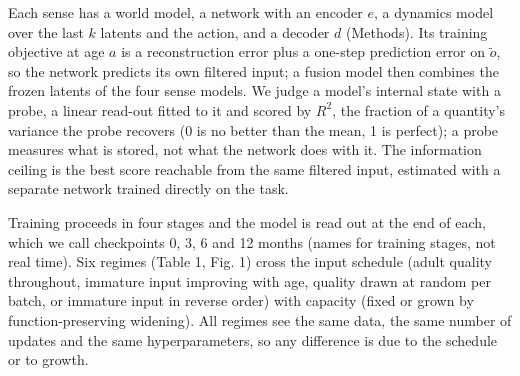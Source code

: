 \documentclass{article}
\begin{document}
Each sense has a world model, a network with an encoder \(e\), a dynamics model over the last \(k\) latents and the action, and a decoder \(d\) (Methods). Its training objective at age \(a\) is a reconstruction error plus a one-step prediction error on \(\tilde o\), so the network predicts its own filtered input; a fusion model then combines the frozen latents of the four sense models. We judge a model's internal state with a probe, a linear read-out fitted to it and scored by \(R^2\), the fraction of a quantity's variance the probe recovers (0 is no better than the mean, 1 is perfect); a probe measures what is stored, not what the network does with it. The information ceiling is the best score reachable from the same filtered input, estimated with a separate network trained directly on the task.

Training proceeds in four stages and the model is read out at the end of each, which we call checkpoints 0, 3, 6 and 12 months (names for training stages, not real time). Six regimes (Table 1, Fig. 1) cross the input schedule (adult quality throughout, immature input improving with age, quality drawn at random per batch, or immature input in reverse order) with capacity (fixed or grown by function-preserving widening). All regimes see the same data, the same number of updates and the same hyperparameters, so any difference is due to the schedule or to growth.
\end{document}
